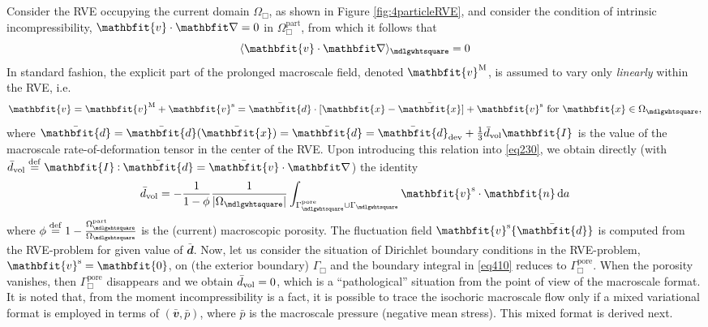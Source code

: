 \documentclass[10pt,a4paper]{article}
\renewcommand{\ta}[1]{\mathbfit{#1}}
\renewcommand{\ts}[1]{\mathbfit{#1}}
\renewcommand{\Box}{\mdlgwhtsquare}
\newcommand{\pore}{\mathrm{pore}}
\newcommand{\particle}{\mathrm{part}}
\begin{document}
Consider the RVE occupying the current domain $\Omega_\Box$, as shown in Figure \ref{fig:4particleRVE}, and consider the condition of intrinsic incompressibility, $\ta{v}\cdot\diff=0$ in $\Omega_\Box^\particle$, from which it follows that
\begin{equation}
    \langle \ta{v}\cdot\diff \rangle_\Box  = 0
\label{eq230}
\end{equation}
In standard fashion, the explicit part of the prolonged macroscale field, denoted $\ta{v}^\macro$, is assumed to vary only \emph{linearly} within the RVE, i.e.
\begin{equation}
    \ta{v} = \ta{v}^\macro + \ta{v}^\fluct =
    \bar{\ts d} \cdot [\ta{x}-\bar{\ta{x}}] + \ta{v}^\fluct \mbox{ for }\ta{x}\in\Omega_\Box,
    \label{eq409}
\end{equation}
where $\bar{\ts d}=\bar{\ts d}(\bar{\ta{x}})=\bar{\ts d}=\bar{\ts d}_\dev+\frac{1}{3}\bar{d}_\vol\ts{I}$ is the value of the macroscale rate-of-deformation tensor in the center of the RVE. Upon introducing this relation into \eqref{eq230}, we obtain directly (with $\bar{d}_\vol\defeq\ts{I}\dprod\bar{\ts d}=\bar{\ta v}\cdot\diff$) the identity
\begin{equation}
    \bar{d}_\vol = - \frac{1}{1-\phi}\frac{1}{|\Omega_\Box|}\int_{\Gamma_\Box^\pore\cup\Gamma_\Box} \ta{v}^\fluct\cdot\ta{n} \dif a
    \label{eq410}
\end{equation}
where $\phi\defeq 1-\frac{\Omega_\Box^\particle}{\Omega_\Box}$ is the (current) macroscopic porosity. The fluctuation field $\ta{v}^\fluct\{\bar{\ts d}\}$ is computed from the RVE-problem for given value of $\bar{\ts d}$. Now, let us consider the situation of Dirichlet boundary conditions in the RVE-problem, $\ta{v}^\fluct=\ta{0}$, on (the exterior boundary) $\Gamma_\Box$ and the boundary integral in \eqref{eq410} reduces to $\Gamma_\Box^\pore$. When the porosity vanishes, then $\Gamma_\Box^\pore$ disappears and we obtain $\bar{d}_{\mathrm{vol}} = 0$, which is a ``pathological'' situation from the point of view of the macroscale format. It is noted that, from the moment incompressibility is a fact, it is possible to trace the isochoric macroscale flow only if a mixed variational format is employed in terms of $(\bar{\ta v},\bar{p})$, where $\bar{p}$ is the macroscale pressure (negative mean stress). This mixed format is derived next.
\end{document}
